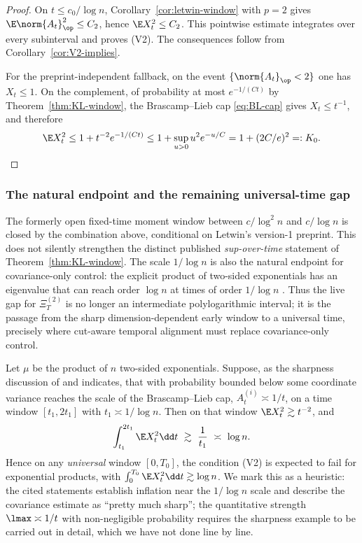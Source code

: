 \documentclass[../../main.tex]{subfiles}
\begin{document}
\begin{proof}
On $t\le c_0/\log n$, Corollary~\ref{cor:letwin-window} with $p=2$ gives
$\E\norm{A_t}_\op^2\le C_2$, hence $\E X_t^2\le C_2$. This pointwise estimate integrates over
every subinterval and proves \textup{(V2)}. The consequences follow from
Corollary~\ref{cor:V2-implies}.

For the preprint-independent fallback, on the event $\{\norm{A_t}_\op<2\}$ one has $X_t\le1$.
On the complement, of probability at most $e^{-1/(Ct)}$ by
Theorem~\ref{thm:KL-window}, the Brascamp--Lieb cap \eqref{eq:BL-cap} gives $X_t\le t^{-1}$,
and therefore
\[
  \E X_t^2\le1+t^{-2}e^{-1/(Ct)}\le1+\sup_{u>0}u^2e^{-u/C}=1+(2C/e)^2=:K_0 .
\]
\end{proof}

\subsubsection{The natural endpoint and the remaining universal-time gap}

The formerly open fixed-time moment window between $c/\log^2n$ and $c/\log n$ is closed by the
combination above, conditional on Letwin's version-1 preprint. This does not silently strengthen
the distinct published \emph{sup-over-time} statement of Theorem~\ref{thm:KL-window}. The scale
$1/\log n$ is also the natural endpoint for covariance-only control: the explicit product of
two-sided exponentials has an eigenvalue that can reach order $\log n$ at times of order
$1/\log n$ \cite[Remarks~62, 64 and Prop.~65]{KLnotes}. Thus the live gap for
$\Xi_T^{(2)}$ is no longer an intermediate polylogarithmic interval; it is the passage from the
sharp dimension-dependent early window to a universal time, precisely where cut-aware temporal
alignment must replace covariance-only control.

\begin{heuristic}
\label{heur:V2-fails}
Let $\mu$ be the product of $n$ two-sided exponentials. Suppose, as the sharpness discussion
of \cite[Remark~62]{KLnotes} and \cite{KlartagChenNotes} indicates, that with probability
bounded below some coordinate variance reaches the scale of the Brascamp--Lieb cap,
$A_t^{(i)}\asymp1/t$, on a time window $[t_1,2t_1]$ with $t_1\asymp1/\log n$. Then on that
window $\E X_t^2\gtrsim t^{-2}$, and
\[
  \int_{t_1}^{2t_1}\E X_t^2\dd t\ \gtrsim\ \frac1{t_1}\ \asymp\ \log n .
\]
Hence on any \emph{universal} window $[0,T_0]$, the condition \textup{(V2)} is expected to
fail for exponential products, with $\int_0^{T_0}\E X_t^2\dd t\gtrsim\log n$. We mark this as
a heuristic: the cited statements establish inflation near the $1/\log n$ scale and describe
the covariance estimate as ``pretty much sharp''; the quantitative strength
$\lmax\asymp1/t$ with non-negligible probability requires the sharpness example to be carried
out in detail, which we have not done line by line.
\end{heuristic}
\end{document}
